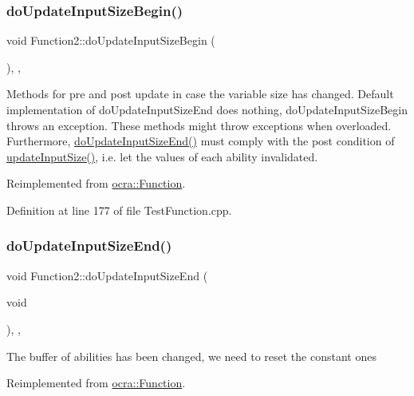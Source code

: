 \subsubsection{\texorpdfstring{do\+Update\+Input\+Size\+Begin()}{doUpdateInputSizeBegin()}}
{\footnotesize\ttfamily void Function2\+::do\+Update\+Input\+Size\+Begin (\begin{DoxyParamCaption}{ }\end{DoxyParamCaption})\hspace{0.3cm}{\ttfamily [inline]}, {\ttfamily [protected]}, {\ttfamily [virtual]}}

Methods for pre and post update in case the variable size has changed. Default implementation of do\+Update\+Input\+Size\+End does nothing, do\+Update\+Input\+Size\+Begin throws an exception. These methods might throw exceptions when overloaded. Furthermore, {\ttfamily \hyperlink{classFunction2_a6a875214e7fa8b07f064cd699ac29ff6}{do\+Update\+Input\+Size\+End()}} must comply with the post condition of {\ttfamily \hyperlink{classocra_1_1Function_a3a5b9e6ae296339acc87ab2cbf97ef98}{update\+Input\+Size()}}, i.\+e. let the values of each ability invalidated. 

Reimplemented from \hyperlink{classocra_1_1Function_a3f728f3758e6448aa59932853db5ddcc}{ocra\+::\+Function}.



Definition at line 177 of file Test\+Function.\+cpp.

\hypertarget{classFunction2_a6a875214e7fa8b07f064cd699ac29ff6}{}\label{classFunction2_a6a875214e7fa8b07f064cd699ac29ff6} 
\subsubsection{\texorpdfstring{do\+Update\+Input\+Size\+End()}{doUpdateInputSizeEnd()}}
{\footnotesize\ttfamily void Function2\+::do\+Update\+Input\+Size\+End (\begin{DoxyParamCaption}\item[{void}]{ }\end{DoxyParamCaption})\hspace{0.3cm}{\ttfamily [inline]}, {\ttfamily [protected]}, {\ttfamily [virtual]}}

The buffer of abilities has been changed, we need to reset the constant ones 

Reimplemented from \hyperlink{classocra_1_1Function_a39f6d91b72eff2d32da7e4a85ee79f7d}{ocra\+::\+Function}.



